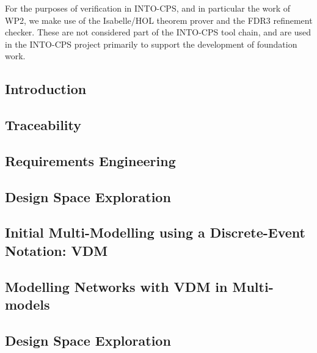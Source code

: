 For the purposes of verification in INTO-CPS, and in particular the work of WP2, we make use of the Isabelle/HOL theorem prover and the FDR3 refinement checker. These are not considered part of the INTO-CPS tool chain, and are used in the INTO-CPS project primarily to support the development of foundation work.


\subsection{Introduction}
\label{sec:method:workflows}

\subsection{Traceability}
\label{sec:method:trace}

\subsection{Requirements Engineering}
\label{sec:method:reqeng}

\subsection{Design Space Exploration}
\label{sec:method:sysml}

\subsection{Initial Multi-Modelling using a Discrete-Event Notation: VDM}
\label{sec:method:defirst}

\subsection{Modelling Networks with VDM in Multi-models}
\label{sec:method:networks}

\subsection{Design Space Exploration}
\label{sec:method:dse}

